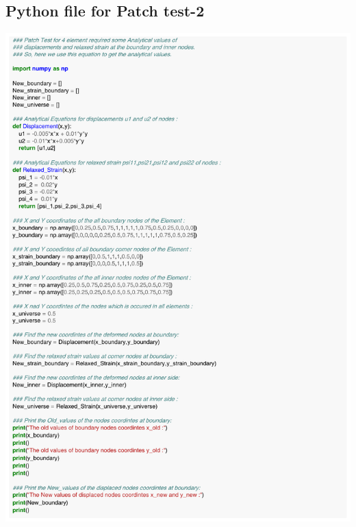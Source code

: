 \documentclass[12pt]{article}
\begin{document}
\begin{appendices}
\section{Python file for Patch test-2}
\includegraphics[scale=0.80,page=1]{Patch_Test_4_elem_eqn.pdf}
\newpage

\end{appendices}
\end{document}
